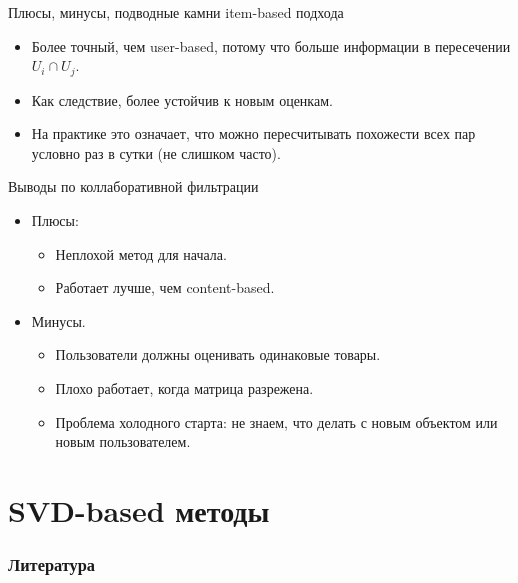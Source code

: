 \documentclass[9pt]{beamer}
\begin{document}
\begin{frame}{Плюсы, минусы, подводные камни item-based подхода}
\begin{itemize}
    \item Более точный, чем user-based, потому что больше информации в пересечении $U_i\cap U_j$.
    \item Как следствие, более устойчив к новым оценкам.
    \item На практике это означает, что можно пересчитывать похожести всех пар условно раз в сутки (не слишком часто).
\end{itemize}
\end{frame}

\begin{frame}{Выводы по коллаборативной фильтрации}
\begin{itemize}
    \item Плюсы:
    \begin{itemize}
        \item Неплохой метод для начала.
        \item Работает лучше, чем content-based.
    \end{itemize}
    \item Минусы.
    \begin{itemize}
        \item Пользователи должны оценивать одинаковые товары.
        \item Плохо работает, когда матрица разрежена.
        \item Проблема холодного старта: не знаем, что делать с новым объектом или новым пользователем.
    \end{itemize}
\end{itemize}
\end{frame}

\section{SVD-based методы}



\begin{frame}[allowframebreaks]
    \frametitle{Литература}
    
    \nocite{rec_systems_cs_center}
    \nocite{rec_systems_habr}
    
\end{frame}
\end{document}
